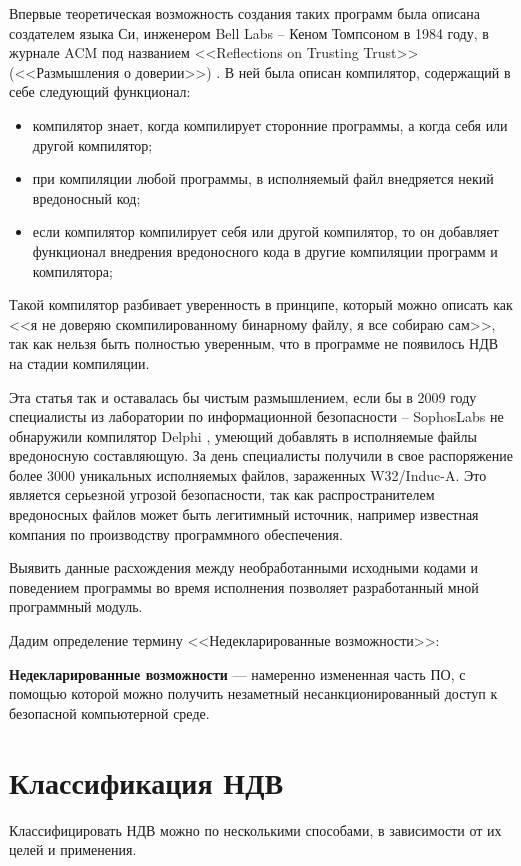 Впервые теоретическая возможность создания таких программ была описана
создателем языка Си, инженером Bell Labs -- Кеном Томпсоном в 1984 году,
в журнале ACM под названием <<Reflections on Trusting Trust>>
(<<Размышления о доверии>>) \autocite{ken-thompson-hack}.
В ней была описан компилятор, содержащий в себе следующий функционал:
\begin{itemize}
    \item компилятор знает, когда компилирует сторонние программы,
        а когда себя или другой компилятор;
    \item при компиляции любой программы, 
        в исполняемый файл внедряется некий вредоносный код;
    \item если компилятор компилирует себя или другой компилятор,
        то он добавляет функционал внедрения вредоносного кода в 
        другие компиляции программ и компилятора;
\end{itemize}

Такой компилятор разбивает уверенность в принципе, который можно описать
как <<я не доверяю скомпилированному бинарному файлу, я все собираю сам>>,
так как нельзя быть полностью уверенным, что 
в программе не появилось НДВ на стадии компиляции.

Эта статья так и оставалась бы чистым размышлением, если бы в 2009 году специалисты
из лаборатории по информационной безопасности -- SophosLabs не обнаружили компилятор
Delphi \autocite{compile-a-virus}, умеющий добавлять в исполняемые файлы вредоносную составляющую.
За день специалисты получили в свое распоряжение более 3000 уникальных исполняемых
файлов, зараженных W32/Induc-A. Это является серьезной угрозой безопасности, так как
распространителем вредоносных файлов может быть легитимный источник, например
известная компания по производству программного обеспечения.

Выявить данные расхождения между необработанными исходными кодами и 
поведением программы во время исполнения позволяет разработанный мной
программный модуль.

Дадим определение термину <<Недекларированные возможности>>:

\textbf{Недекларированные возможности} \autocite{undeclared-capabilities-antimalware} 
— намеренно измененная часть ПО, с помощью которой можно получить незаметный 
несанкционированный доступ к безопасной компьютерной среде.

\section{Классификация НДВ}\label{sec:ch1/sec2}
Классифицировать НДВ можно по несколькими способами, в
зависимости от их целей и применения.

